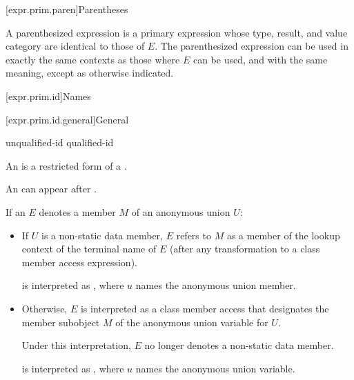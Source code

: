 [expr.prim.paren]{Parentheses}

\pnum
{}%
A parenthesized expression 
is a primary expression whose type, result, and value category are identical to those of $E$.
The parenthesized expression can be used in exactly the same contexts as
those where $E$ can be used, and with the same
meaning, except as otherwise indicated.

[expr.prim.id]{Names}

[expr.prim.id.general]{General}

\begin{bnf}
\br
    unqualified-id\br
    qualified-id
\end{bnf}

\pnum
{}%
%
An  is a restricted form of a
.
\begin{note}
An  can appear after
.
\end{note}

\pnum
If an  $E$ denotes
a member $M$ of an anonymous union $U$:
\begin{itemize}
\item
If $U$ is a non-static data member,
$E$ refers to $M$ as a member of the lookup context of the terminal name of $E$ (after any transformation to
a class member access expression).
\begin{example}
 is interpreted as ,
where $u$ names the anonymous union member.
\end{example}
\item
Otherwise, $E$ is interpreted as a class member access
that designates the member subobject $M$ of
the anonymous union variable for $U$.
\begin{note}
Under this interpretation, $E$ no longer denotes a non-static data member.
\end{note}
\begin{example}
 is interpreted as ,
where $u$ names the anonymous union variable.
\end{example}
\end{itemize}

